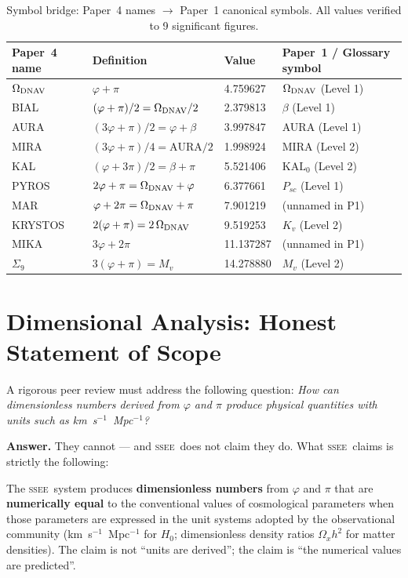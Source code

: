 \documentclass[12pt,a4paper]{article}
\newcommand{\SSEE}{\ifmmode\mathrm{SSEE}\else\textsc{ssee}\fi}
\begin{document}
\begin{table}[ht]
\centering
\caption{Symbol bridge: Paper~4 names $\to$ Paper~1 canonical symbols.
  All values verified to 9 significant figures.}
\label{tab:symbol_bridge}
\small
\begin{tabular}{llll}
\toprule
Paper~4 name & Definition & Value & Paper~1 / Glossary symbol \\
\midrule
$\Omega_{\rm DNAV}$ & $\varphi+\pi$ & 4.759627 & $\Omega_{\rm DNAV}$ (Level 1) \\
BIAL  & $(\varphi+\pi)/2 = \Omega_{\rm DNAV}/2$ & 2.379813 & $\beta$ (Level 1) \\
AURA  & $(3\varphi+\pi)/2 = \varphi+\beta$ & 3.997847 & AURA (Level 1) \\
MIRA  & $(3\varphi+\pi)/4 = \mathrm{AURA}/2$ & 1.998924 & MIRA (Level 2) \\
KAL   & $(\varphi+3\pi)/2 = \beta+\pi$ & 5.521406 & $\mathrm{KAL}_0$ (Level 2) \\
PYROS & $2\varphi+\pi = \Omega_{\rm DNAV}+\varphi$ & 6.377661 & $P_{sc}$ (Level 1) \\
MAR   & $\varphi+2\pi = \Omega_{\rm DNAV}+\pi$ & 7.901219 & (unnamed in P1) \\
KRYSTOS & $2(\varphi+\pi) = 2\,\Omega_{\rm DNAV}$ & 9.519253 & $K_v$ (Level 2) \\
MIKA  & $3\varphi+2\pi$ & 11.137287 & (unnamed in P1) \\
$\Sigma_9$ & $3(\varphi+\pi) = M_v$ & 14.278880 & $M_v$ (Level 2) \\
\bottomrule
\end{tabular}
\end{table}

\section{Dimensional Analysis: Honest Statement of Scope}
\label{sec:dimensional}

A rigorous peer review must address the following question:
\emph{How can dimensionless numbers derived from $\varphi$ and $\pi$ produce
physical quantities with units such as km~s$^{-1}$~Mpc$^{-1}$?}

\textbf{Answer.}
They cannot — and \SSEE\ does not claim they do.
What \SSEE\ claims is strictly the following:

\begin{tcolorbox}[colback=blue!5,colframe=blue!50,title=Scope of SSEE Predictions]
The \SSEE\ system produces \textbf{dimensionless numbers} from $\varphi$ and
$\pi$ that are \textbf{numerically equal} to the conventional values of
cosmological parameters when those parameters are expressed in the unit
systems adopted by the observational community
(km~s$^{-1}$~Mpc$^{-1}$ for $H_0$; dimensionless density ratios $\Omega_x h^2$
for matter densities).
The claim is not ``units are derived''; the claim is
``the numerical values are predicted''.
\end{tcolorbox}
\end{document}
